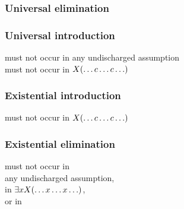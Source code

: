 \begin{multicols}{2}
\subsubsection*{Universal elimination}

\begin{pf}
	 
\end{pf}

\subsubsection*{Universal introduction}

\begin{pf}
	 
\end{pf}

\noindent 	{} must not occur in any undischarged assumption\\ 
 must not occur in $X(\ldots c \ldots c\ldots)$


\subsubsection*{Existential introduction}

\begin{pf}
	 
\end{pf}

\noindent {} must not occur in $X(\ldots c \ldots c\ldots)$

\subsubsection*{Existential elimination}

\begin{pf}
	\open	
		\ellipsesline
	\close
	 
\end{pf}

\noindent {} must not occur in \\any undischarged assumption, \\in $\exists xX(\ldots x \ldots x\ldots)$, \\or in \metaY
\end{multicols}

